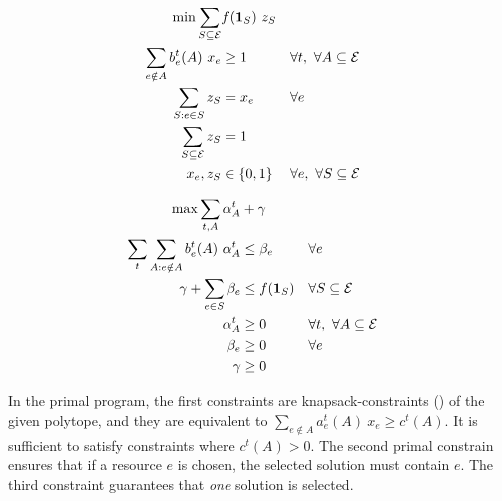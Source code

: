 \begin{minipage}[t]{0.45\textwidth}
\begin{align*}
\min  \sum_{S \subseteq \mathcal{E}} &f(\mathbf{1}_{S})\ z_{S} \\
\sum_{e \notin A} b_{e}^{t}(A) \ x_{e} &\geq 1 & &  \forall t,\ \forall A \subseteq \mathcal{E} \\
\sum_{S: e \in S} z_{S}  &= x_{e}	& & \forall e \\
\sum_{S \subseteq \mathcal{E}} z_{S} &= 1 & & \\
x_{e}, z_{S} &\in \{0,1\} & & \forall e,\ \forall S \subseteq \mathcal{E}\\
\end{align*}
\end{minipage}
\quad
\begin{minipage}[t]{0.5\textwidth}
\begin{align*}
\max \sum_{t, A} \alpha^{t}_{A} &+ \gamma \\
\sum_{t} \sum_{A: e \notin A} b_{e}^{t}(A) \ \alpha_{A}^{t} &\leq \beta_{e}  & &  \forall e \\
\gamma + \sum_{e \in S} \beta_{e} &\leq f(\mathbf{1}_{S})  & & \forall S \subseteq \mathcal{E}\\
\alpha^{t}_{A} &\geq 0 & & \forall t,\ \forall A \subseteq \mathcal{E}\\
\beta_e &\geq 0 & & \forall e\\
\gamma &\geq 0 & &
\end{align*}
\end{minipage}

In the primal program, the first constraints are knapsack-constraints (\cite{CarrFleischer:2000}) of the given polytope, and they are equivalent to $\sum_{e \notin A} a_{e}^{t}(A) \ x_{e} \geq c^{t}(A)$. It is sufficient to satisfy constraints where $c^{t}(A) > 0$. The second primal constrain ensures that if a resource $e$ is chosen, the selected solution must contain $e$.
The third constraint guarantees that \emph{one} solution is selected.

